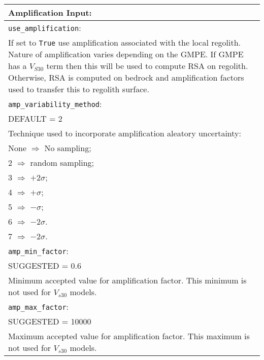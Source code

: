\vspace{2em}
\begin{tabular}{|p{\textwidth}|}
\hline
\vspace{0.3em} \noindent \Large \textbf{Amplification Input:} \normalsize \\
\hline \vspace{0.1em} \texttt{use\_amplification}: \\
If set to \texttt{True} use amplification associated with the local regolith. 
Nature of amplification varies depending on the GMPE. If GMPE has a $V_{S30}$ term
then this will be used to compute RSA on regolith. Otherwise, RSA is computed on 
bedrock and amplification factors used to transfer this to regolith surface. \\
\hline \vspace{0.1em} \texttt{amp\_variability\_method}: \\
DEFAULT = 2 \\
Technique used to incorporate amplification aleatory uncertainty: \\
 \hspace{0.5em} None $\Rightarrow$ No sampling; \\
 \hspace{0.5em} 2 $\Rightarrow$ random sampling; \\
 \hspace{0.5em} 3 $\Rightarrow$ $+2\sigma$; \\
 \hspace{0.5em} 4 $\Rightarrow$ $+\sigma$; \\
 \hspace{0.5em} 5 $\Rightarrow$ $-\sigma$; \\
 \hspace{0.5em} 6 $\Rightarrow$ $-2\sigma$.\\
 \hspace{0.5em} 7 $\Rightarrow$ $-2\sigma$.\\
\hline \vspace{0.1em} \texttt{amp\_min\_factor}: \\
SUGGESTED = 0.6 \\
Minimum accepted value for amplification factor. 
This minimum is not used for $V_{s30}$ models.   \\
\hline \vspace{0.1em} \texttt{amp\_max\_factor}: \\
SUGGESTED = 10000 \\
Maximum accepted value for amplification factor. 
This maximum is not used for $V_{s30}$ models.    \\
\hline
\end{tabular}

